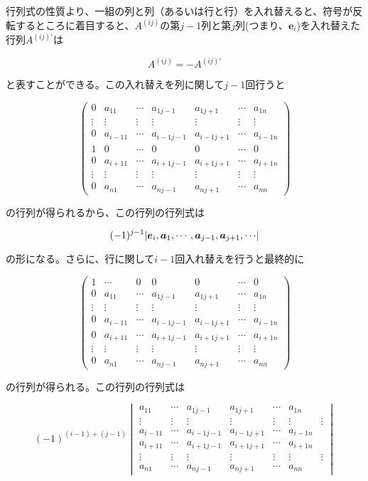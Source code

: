 \documentclass[dvipdfmx,autodetect-engine]{jsarticle}
\theoremstyle{definition}
\DeclarePairedDelimiter{\abs}{\lvert}{\rvert}
\begin{document}
行列式の性質より、一組の列と列（あるいは行と行）を入れ替えると、符号が反転するところに着目すると、$A^{(ij)}$の第$j-1$列と第$j$列(つまり、$\bm{e}_i$)を入れ替えた行列$A^{(ij)'}$は

$$
A^{(ij)} = -A^{(ij)'}
$$

と表すことができる。この入れ替えを列に関して$j-1$回行うと

$$
\begin{pmatrix*}
0 & a_{11} & \cdots & a_{1{j-1}} & a_{1{j+1}} & \cdots & a_{1n} \\
\vdots & \vdots & \vdots & \vdots & \vdots & \vdots & \vdots \\
0 & a_{{i-1}1} & \cdots & a_{{i-1}{j-1}} & a_{{i-1}{j+1}} & \cdots & a_{{i-1}n} \\
1 & 0 & \cdots & 0 & 0 & \cdots & 0 \\
0 & a_{{i+1}1} & \cdots & a_{{i+1}{j-1}} & a_{{i+1}{j+1}} & \cdots & a_{{i+1}n} \\
\vdots & \vdots & \vdots & \vdots & \vdots & \vdots & \vdots \\
0 & a_{n1} & \cdots & a_{n{j-1}} & a_{n{j+1}} & \cdots & a_{nn}
\end{pmatrix*}
$$

の行列が得られるから、この行列の行列式は

$$
(-1)^{j-1}\abs{\bm{e}_i, \bm{a}_1, \cdots, \bm{a}_{j-1}, \bm{a}_{j+1}, \cdots}
$$

の形になる。さらに、行に関して$i-1$回入れ替えを行うと最終的に

$$
\begin{pmatrix*}
1 & \cdots & 0 & 0 & 0 & \cdots & 0 \\
0 & a_{11} & \cdots & a_{1{j-1}} & a_{1{j+1}} & \cdots & a_{1n} \\
\vdots & \vdots & \vdots & \vdots & \vdots & \vdots & \vdots \\
0 & a_{{i-1}1} & \cdots & a_{{i-1}{j-1}} & a_{{i-1}{j+1}} & \cdots & a_{{i-1}n} \\
0 & a_{{i+1}1} & \cdots & a_{{i+1}{j-1}} &a_{{i+1}{j+1}} & \cdots & a_{{i+1}n} \\
\vdots & \vdots & \vdots & \vdots &\vdots & \vdots & \vdots \\
0 & a_{n1} & \cdots & a_{n{j-1}} &a_{n{j+1}} & \cdots & a_{nn}
\end{pmatrix*}
$$

の行列が得られる。この行列の行列式は

$$
(-1)^{(i-1)+(j-1)}\begin{vmatrix}
a_{11} & \cdots & a_{1{j-1}} & a_{1{j+1}} & \cdots & a_{1n} \\
\vdots & \vdots & \vdots & \vdots & \vdots & \vdots & \vdots \\
a_{{i-1}1} & \cdots & a_{{i-1}{j-1}} & a_{{i-1}{j+1}} & \cdots & a_{{i-1}n} \\
a_{{i+1}1} & \cdots & a_{{i+1}{j-1}} &a_{{i+1}{j+1}} & \cdots & a_{{i+1}n} \\
\vdots & \vdots & \vdots & \vdots &\vdots & \vdots & \vdots \\
a_{n1} & \cdots & a_{n{j-1}} &a_{n{j+1}} & \cdots & a_{nn}
\end{vmatrix}
$$
\end{document}
